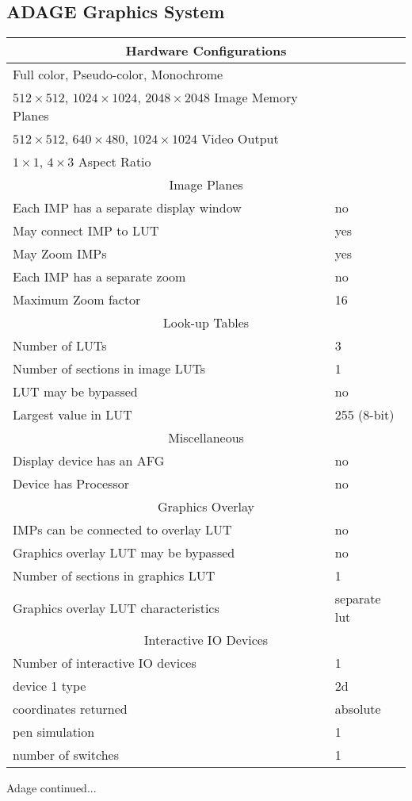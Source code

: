 \newpage
\subsection{ADAGE Graphics System}
\begin{tabular}{|l l|}
\hline
\multicolumn{2}{|c|}{Hardware Configurations}\\
\hline
Full color, Pseudo-color, Monochrome & \\
$512 \times 512$, $1024 \times 1024$, $2048 \times 2048$ Image Memory Planes & \\
$512 \times 512$, $640 \times 480$, $1024 \times 1024$ Video Output & \\
$1 \times 1$, $4 \times 3$ Aspect Ratio & \\ 
\hline \hline
\multicolumn{2}{|c|}{Image Planes}\\ \hline
Each IMP has a separate display window & no\\
May connect IMP to LUT & yes\\
May Zoom IMPs & yes\\
Each IMP has a separate zoom & no\\
Maximum Zoom factor & 16\\
\hline \hline 
\multicolumn{2}{|c|}{Look-up Tables}\\ 
\hline
Number of LUTs & 3\\
Number of sections in image LUTs & 1\\
LUT may be bypassed & no\\
Largest value in LUT & 255 (8-bit)\\
\hline \hline 
\multicolumn{2}{|c|}{Miscellaneous}\\ 
\hline
Display device has an AFG & no \\
Device has Processor & no\\ 
\hline \hline 
\multicolumn{2}{|c|}{Graphics Overlay}\\ 
\hline
IMPs can be connected to overlay LUT & no\\
Graphics overlay LUT may be bypassed & no\\
Number of sections in graphics LUT & 1\\
Graphics overlay LUT characteristics & separate lut\\
\hline 
\hline
\multicolumn{2}{|c|}{Interactive IO Devices}\\ 
\hline
Number of interactive IO devices & 1\\
device 1 type & 2d\\
coordinates returned & absolute\\
pen simulation & 1\\
number of switches & 1\\
\hline 
\end{tabular}
\newpage
Adage continued...

